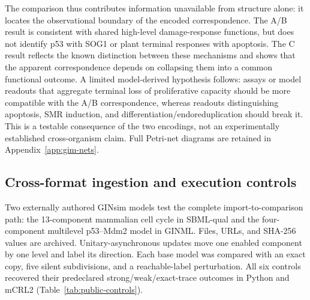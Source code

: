 \documentclass{ws-jbcb}
\numberwithin{equation}{section}
\begin{document}
The comparison thus contributes information unavailable from structure alone:
it locates the observational boundary of the encoded correspondence. The A/B
result is consistent with shared high-level damage-response functions, but does
not identify p53 with SOG1 or plant terminal responses with apoptosis. The C
result reflects the known distinction between these mechanisms and shows that
the apparent correspondence depends on collapsing them into a common functional
outcome. A limited model-derived hypothesis follows: assays or model readouts
that aggregate terminal loss of proliferative capacity should be more compatible
with the A/B correspondence, whereas readouts distinguishing apoptosis, SMR
induction, and differentiation/endoreduplication should break it. This is a
testable consequence of the two encodings, not an experimentally established
cross-organism claim. Full Petri-net diagrams are retained in
Appendix~\ref{app:gim-nets}.

\subsection{Cross-format ingestion and execution controls}
\label{sec:public-method}

Two externally authored GINsim models test the complete import-to-comparison
path: the 13-component mammalian cell cycle in SBML-qual and the four-component
multilevel p53--Mdm2 model in GINML.\cite{Naldi2018,Traynard2016,
Chaouiya2013SBML,AbouJaoude2009} Files, URLs, and SHA-256 values are archived.
Unitary-asynchronous updates move one enabled component by one level and label
its direction. Each base model was compared with an exact copy, five silent
subdivisions, and a reachable-label perturbation. All six controls recovered
their predeclared strong/weak/exact-trace outcomes in Python and mCRL2
(Table~\ref{tab:public-controls}).

\begin{table}[t]
\end{table}
\end{document}
